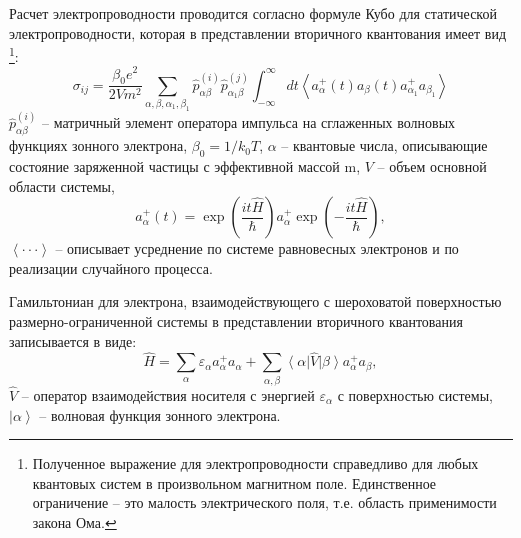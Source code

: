 Расчет электропроводности проводится согласно формуле Кубо \cite{Kubo1957a} для статической электропроводности, которая в представлении вторичного квантования имеет вид \footnote{ Полученное выражение для электропроводности справедливо для любых квантовых систем в произвольном магнитном поле. Единственное ограничение -- это малость электрического поля, т.е. область применимости закона Ома.}:
\begin{equation} \label{eq:31_10}
\sigma _{ij} =\frac{\beta _{0} e^{2} }{2Vm^{2} } \sum _{\alpha ,\beta ,\alpha _{1} ,\beta _{1} }\hat{p}_{\alpha \beta }^{(i)} \hat{p}_{\alpha _{1} \beta }^{(j)} \int _{-\infty }^{\infty }dt\left\langle a_{\alpha }^{+} (t)a_{\beta } (t)a_{\alpha _{1} }^{+} a_{\beta _{1} } \right\rangle
\end{equation} 
$\hat{p}_{\alpha \beta }^{(i)} $ -- матричный элемент оператора импульса на сглаженных волновых функциях зонного электрона, $\beta _{0} =1/k_{0} T$, $\alpha $ -- квантовые числа, описывающие состояние заряженной частицы с эффективной массой m, $V$ -- объем основной области системы,
\[
a_{\alpha }^{+} (t)= \exp\left(\frac{it\hat{H}}{\hbar } \right)a_{\alpha }^{+} \exp\left(-\frac{it\hat{H}}{\hbar } \right),
\] 
$\left\langle \cdot \cdot \cdot \right\rangle $ -- описывает усреднение по системе равновесных электронов и по реализации случайного процесса.

Гамильтониан для электрона, взаимодействующего с шероховатой поверхностью размерно-ограниченной системы в представлении вторичного квантования записывается в виде:
\begin{equation} \label{eq:31_20}
\hat{H}=\sum _{\alpha }\varepsilon _{\alpha } a_{\alpha }^{+} a_{\alpha } +\sum _{\alpha ,\beta }{\left\langle \alpha  \right|} \hat{V}{\left| \beta  \right\rangle} a_{\alpha }^{+} a_{\beta }, 
\end{equation}
$\hat{V}$ -- оператор взаимодействия носителя с энергией $\varepsilon _{\alpha } $ с поверхностью системы, ${\left| \alpha  \right\rangle} $ -- волновая функция зонного электрона.

